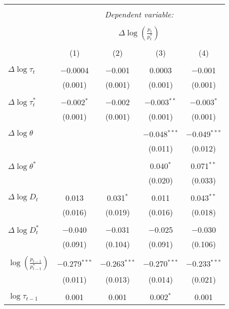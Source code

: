 
\begin{tabular}{@{\extracolsep{5pt}}lcccc} 
\\[-1.8ex]\hline 
\hline \\[-1.8ex] 
 & \multicolumn{4}{c}{\textit{Dependent variable:}} \\ 
\cline{2-5} 
\\[-1.8ex] & \multicolumn{4}{c}{$\Delta \log \left(\frac{p_t}{p_t^*} \right)$} \\ 
\\[-1.8ex] & (1) & (2) & (3) & (4)\\ 
\hline \\[-1.8ex] 
 $\Delta \log \tau_t$ & $-$0.0004 & $-$0.001 & 0.0003 & $-$0.001 \\ 
  & (0.001) & (0.001) & (0.001) & (0.001) \\ 
  & & & & \\ 
 $\Delta \log \tau_t^*$ & $-$0.002$^{*}$ & $-$0.002 & $-$0.003$^{**}$ & $-$0.003$^{*}$ \\ 
  & (0.001) & (0.001) & (0.001) & (0.001) \\ 
  & & & & \\ 
 $\Delta \log \theta$ &  &  & $-$0.048$^{***}$ & $-$0.049$^{***}$ \\ 
  &  &  & (0.011) & (0.012) \\ 
  & & & & \\ 
 $\Delta \log \theta^*$ &  &  & 0.040$^{*}$ & 0.071$^{**}$ \\ 
  &  &  & (0.020) & (0.033) \\ 
  & & & & \\ 
 $\Delta \log D_t$ & 0.013 & 0.031$^{*}$ & 0.011 & 0.043$^{**}$ \\ 
  & (0.016) & (0.019) & (0.016) & (0.018) \\ 
  & & & & \\ 
 $\Delta \log D_t^*$ & $-$0.040 & $-$0.031 & $-$0.025 & $-$0.030 \\ 
  & (0.091) & (0.104) & (0.091) & (0.106) \\ 
  & & & & \\ 
 $\log \left(\frac{p_{t-1}}{p_{t-1}^*} \right)$ & $-$0.279$^{***}$ & $-$0.263$^{***}$ & $-$0.270$^{***}$ & $-$0.233$^{***}$ \\ 
  & (0.011) & (0.013) & (0.014) & (0.021) \\ 
  & & & & \\ 
 $\log \tau_{t-1}$ & 0.001 & 0.001 & 0.002$^{*}$ & 0.001 \\ 

\end{tabular}

